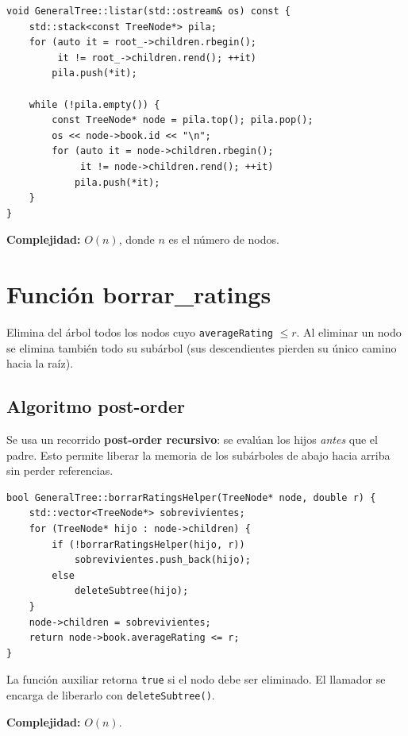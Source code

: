 \documentclass[12pt, a4paper]{article}
\begin{document}
\begin{lstlisting}
void GeneralTree::listar(std::ostream& os) const {
    std::stack<const TreeNode*> pila;
    for (auto it = root_->children.rbegin();
         it != root_->children.rend(); ++it)
        pila.push(*it);

    while (!pila.empty()) {
        const TreeNode* node = pila.top(); pila.pop();
        os << node->book.id << "\n";
        for (auto it = node->children.rbegin();
             it != node->children.rend(); ++it)
            pila.push(*it);
    }
}
\end{lstlisting}

\textbf{Complejidad:} $O(n)$, donde $n$ es el número de nodos.

\section{Función borrar\_ratings}

Elimina del árbol todos los nodos cuyo \texttt{averageRating} $\leq r$. Al eliminar
un nodo se elimina también todo su subárbol (sus descendientes pierden su único
camino hacia la raíz).

\subsection{Algoritmo post-order}

Se usa un recorrido \textbf{post-order recursivo}: se evalúan los hijos \textit{antes}
que el padre. Esto permite liberar la memoria de los subárboles de abajo hacia arriba
sin perder referencias.

\begin{lstlisting}
bool GeneralTree::borrarRatingsHelper(TreeNode* node, double r) {
    std::vector<TreeNode*> sobrevivientes;
    for (TreeNode* hijo : node->children) {
        if (!borrarRatingsHelper(hijo, r))
            sobrevivientes.push_back(hijo);
        else
            deleteSubtree(hijo);
    }
    node->children = sobrevivientes;
    return node->book.averageRating <= r;
}
\end{lstlisting}

La función auxiliar retorna \texttt{true} si el nodo debe ser eliminado. El llamador
se encarga de liberarlo con \texttt{deleteSubtree()}.

\textbf{Complejidad:} $O(n)$.

\end{document}
